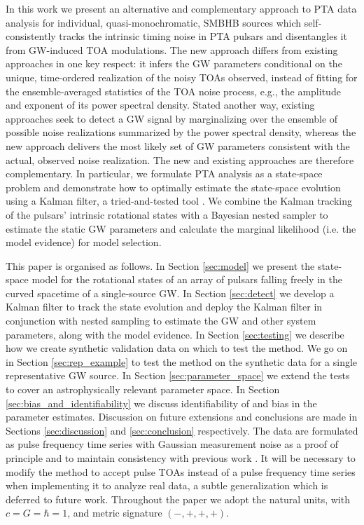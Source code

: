 \documentclass[fleqn,usenatbib,useAMS]{mnras}
\begin{document}
In this work we present an alternative and complementary approach to PTA data analysis for individual, quasi-monochromatic, SMBHB sources which self-consistently tracks the intrinsic timing noise in PTA pulsars and disentangles it from GW-induced TOA modulations. The new approach differs from existing approaches in one key respect: it infers the GW parameters conditional on the unique, time-ordered realization of the noisy TOAs observed, instead of fitting for the ensemble-averaged statistics of the TOA noise process, e.g., the amplitude and exponent of its power spectral density. Stated another way, existing approaches seek to detect a GW signal by marginalizing over the ensemble of possible noise realizations summarized by the power spectral density, whereas the new approach delivers the most likely set of GW parameters consistent with the actual, observed noise realization. The new and existing approaches are therefore complementary. In particular, we formulate PTA analysis as a state-space problem and demonstrate how to optimally estimate the state-space evolution using a Kalman filter, a tried-and-tested tool \citep{Kalman1,Meyers2021,Melatos2023}. We combine the Kalman tracking of the pulsars' intrinsic rotational states with a Bayesian nested sampler \citep{Skilling, Ashton2022} to estimate the static GW parameters and calculate the marginal likelihood (i.e. the model evidence) for model selection. \newline 


This paper is organised as follows. In Section \ref{sec:model} we present the state-space model for the rotational states of an array of pulsars falling freely in the curved spacetime of a single-source GW. In Section \ref{sec:detect} we develop a Kalman filter to track the state evolution and deploy the Kalman filter in conjunction with nested sampling to estimate the GW and other system parameters, along with the model evidence. In Section \ref{sec:testing} we describe how we create synthetic validation data on which to test the method. We go on in Section \ref{sec:rep_example} to test the method on the synthetic data for a single representative GW source. In Section \ref{sec:parameter_space} we extend the tests to cover an astrophysically relevant parameter space. In Section \ref{sec:bias_and_identifiability} we discuss identifiability of and bias in the parameter estimates. Discussion on  future extensions and conclusions are made in Sections \ref{sec:discussion} and \ref{sec:conclusion} respectively. The data are formulated as pulse frequency time series with Gaussian measurement noise as a proof of principle and to maintain consistency with previous work \citep{Myers2021MNRAS.502.3113M,Meyers2021}. It will be necessary to modify the method to accept pulse TOAs instead of a pulse frequency time series when implementing it to analyze real data, a subtle generalization which is deferred to future work. Throughout the paper we adopt the natural units, with $c = G = \hbar = 1$, and metric signature $(-,+,+,+)$. \newline 
\end{document}
